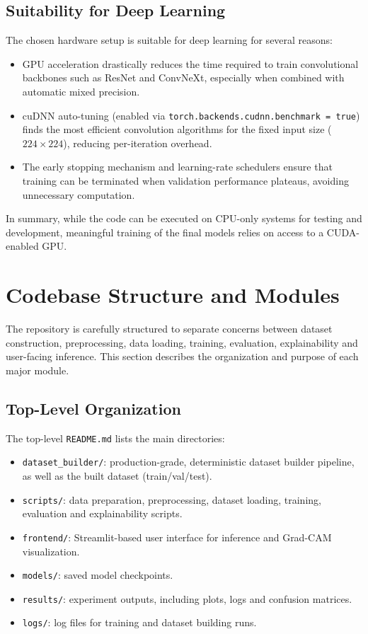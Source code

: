 \subsection{Suitability for Deep Learning}

The chosen hardware setup is suitable for deep learning for several reasons:
\begin{itemize}
  \item GPU acceleration drastically reduces the time required to train convolutional backbones such as ResNet and ConvNeXt, especially when combined with automatic mixed precision.
  \item cuDNN auto-tuning (enabled via \texttt{torch.backends.cudnn.benchmark = true}) finds the most efficient convolution algorithms for the fixed input size ($224\times 224$), reducing per-iteration overhead.
  \item The early stopping mechanism and learning-rate schedulers ensure that training can be terminated when validation performance plateaus, avoiding unnecessary computation.
\end{itemize}

In summary, while the code can be executed on CPU-only systems for testing and development, meaningful training of the final models relies on access to a CUDA-enabled GPU.

\section{Codebase Structure and Modules}
\label{sec:structure}

The repository is carefully structured to separate concerns between dataset construction, preprocessing, data loading, training, evaluation, explainability and user-facing inference. This section describes the organization and purpose of each major module.

\subsection{Top-Level Organization}

The top-level \texttt{README.md} lists the main directories:
\begin{itemize}
  \item \texttt{dataset\_builder/}: production-grade, deterministic dataset builder pipeline, as well as the built dataset (train/val/test).
  \item \texttt{scripts/}: data preparation, preprocessing, dataset loading, training, evaluation and explainability scripts.
  \item \texttt{frontend/}: Streamlit-based user interface for inference and Grad-CAM visualization.
  \item \texttt{models/}: saved model checkpoints.
  \item \texttt{results/}: experiment outputs, including plots, logs and confusion matrices.
  \item \texttt{logs/}: log files for training and dataset building runs.
\end{itemize}

